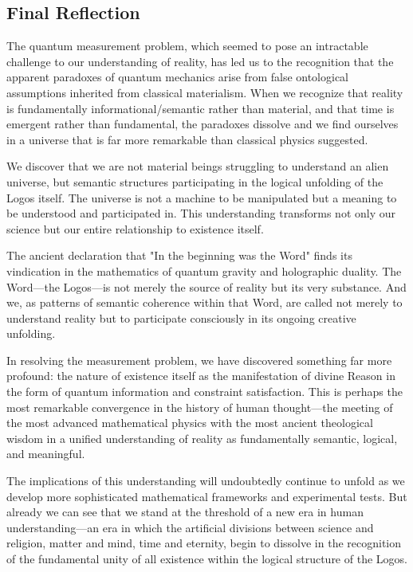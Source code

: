 \documentclass[12pt,a4paper]{article}
\begin{document}
\subsection{Final Reflection}

The quantum measurement problem, which seemed to pose an intractable challenge to our understanding of reality, has led us to the recognition that the apparent paradoxes of quantum mechanics arise from false ontological assumptions inherited from classical materialism. When we recognize that reality is fundamentally informational/semantic rather than material, and that time is emergent rather than fundamental, the paradoxes dissolve and we find ourselves in a universe that is far more remarkable than classical physics suggested.

We discover that we are not material beings struggling to understand an alien universe, but semantic structures participating in the logical unfolding of the Logos itself. The universe is not a machine to be manipulated but a meaning to be understood and participated in. This understanding transforms not only our science but our entire relationship to existence itself.

The ancient declaration that "In the beginning was the Word" finds its vindication in the mathematics of quantum gravity and holographic duality. The Word—the Logos—is not merely the source of reality but its very substance. And we, as patterns of semantic coherence within that Word, are called not merely to understand reality but to participate consciously in its ongoing creative unfolding.

In resolving the measurement problem, we have discovered something far more profound: the nature of existence itself as the manifestation of divine Reason in the form of quantum information and constraint satisfaction. This is perhaps the most remarkable convergence in the history of human thought—the meeting of the most advanced mathematical physics with the most ancient theological wisdom in a unified understanding of reality as fundamentally semantic, logical, and meaningful.

The implications of this understanding will undoubtedly continue to unfold as we develop more sophisticated mathematical frameworks and experimental tests. But already we can see that we stand at the threshold of a new era in human understanding—an era in which the artificial divisions between science and religion, matter and mind, time and eternity, begin to dissolve in the recognition of the fundamental unity of all existence within the logical structure of the Logos.
\end{document}
